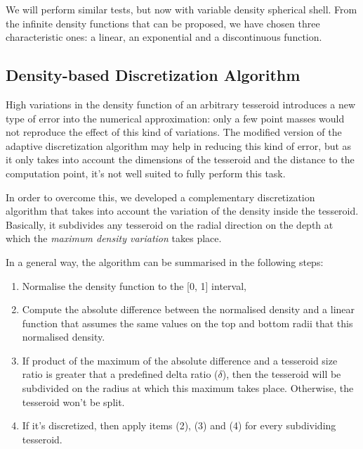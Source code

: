 \documentclass[extra]{gji}
\begin{document}
We will perform similar tests, but now with variable density spherical 
shell.
From the infinite density functions that can be proposed, we have 
chosen three characteristic ones: a linear, an exponential and a 
discontinuous function.


\subsection{Density-based Discretization Algorithm}

High variations in the density function of an arbitrary tesseroid 
introduces a new type of error into the numerical approximation: only a 
few point masses would not reproduce the effect of this kind of 
variations.
The modified version of the adaptive discretization algorithm may help 
in reducing this kind of error, but as it only takes into account the 
dimensions of the tesseroid and the distance to the computation point, 
it's not well suited to fully perform this task.

In order to overcome this, we developed a complementary discretization 
algorithm that takes into account the variation of the density inside 
the tesseroid. Basically, it subdivides any tesseroid on the radial 
direction on the depth at which the \emph{maximum density variation} 
takes place.

In a general way, the algorithm can be summarised in the following steps:

\begin{enumerate}
\renewcommand{\theenumi}{(\arabic{enumi})}
    \item Normalise the density function to the [0, 1] interval,
    \item Compute the absolute difference between the normalised 
          density and a linear function that assumes the same values on the 
          top and bottom radii that this normalised density.
    \item If product of the maximum of the absolute difference and a 
          tesseroid size ratio is greater that a predefined delta ratio 
          ($\delta$), then the tesseroid will be subdivided on the 
          radius at which this maximum takes place. Otherwise, the 
          tesseroid won't be split.
    \item If it's discretized, then apply items (2), (3) and (4) for 
          every subdividing tesseroid.
\end{enumerate}
\end{document}

